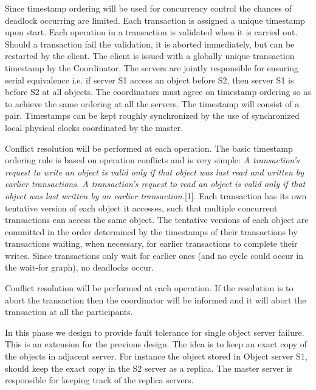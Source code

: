 \documentclass[times, 10pt,twocolumn]{article}
\begin{document}
\label{subsec:dldetect}
Since timestamp ordering will be used for concurrency control the chances of deadlock occurring are limited.
Each transaction is assigned a unique timestamp upon start. Each operation in a transaction is validated when it is carried out.
Should a transaction fail the validation, it is aborted immediately, but can be restarted by the client. The client is issued with a globally unique transaction timestamp by the Coordinator. The servers are jointly responsible for ensuring serial equivalence i.e. if server S1 access an object before S2, then server S1 is before S2 at all objects. The coordinators must agree on timestamp ordering so as to achieve the same ordering at all the servers. The timestamp will consist of a {\it <local timestamp, server-id> } pair. Timestamps can be kept roughly synchronized by the use of synchronized local physical clocks coordinated by the master.

Conflict resolution will be performed at each operation.
The basic timestamp ordering rule is based on operation conflicts and is very simple:
{\it A transaction’s request to write an object is valid only if that object was last read and written by earlier transactions. A transaction’s request to read an object is valid only if that object was
last written by an earlier transaction.}[1]. Each transaction has its own tentative version of each object it accesses, such that multiple concurrent transactions can access the same object. The tentative
versions of each object are committed in the order determined by the timestamps of their transactions by transactions waiting, when necessary, for earlier transactions to complete their writes.
Since transactions only wait for earlier ones (and no cycle could occur in the wait-for graph), no deadlocks occur.

Conflict resolution will be performed at each operation. If the resolution is to abort the transaction then the coordinator will be informed and it will abort the transaction at all the participants.

\label{subsec:faultol}
In this phase we design to provide fault tolerance for single object server failure. This is an extension for the previous design. The idea is to keep an exact copy of the objects in adjacent server.
For instance the object stored in Object server S1, should keep the exact copy in the S2 server as a replica. The master server is responsible for keeping track of the replica servers.
\end{document}
